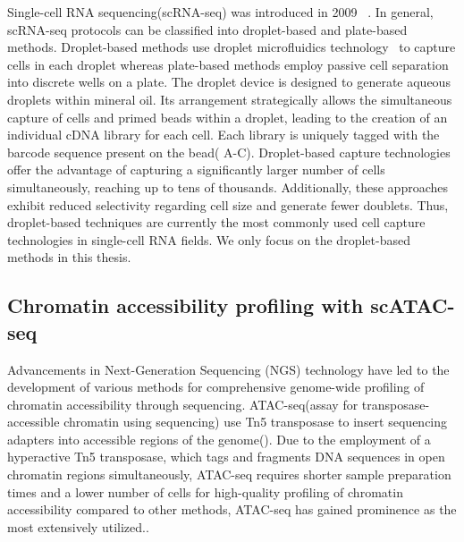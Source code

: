Single-cell RNA sequencing(scRNA-seq) was introduced in 2009 ~\citep{tang2009mrna}. In general, scRNA-seq protocols can be classified into droplet-based and plate-based methods. Droplet-based methods use droplet microfluidics technology~\citep{dropletcompare2019, droplet2019practice} to capture cells in each droplet whereas plate-based methods employ passive cell separation into discrete wells on a plate. The droplet device is designed to generate aqueous droplets within mineral oil. Its arrangement strategically allows the simultaneous capture of cells and primed beads within a droplet, leading to the creation of an individual cDNA library for each cell. Each library is uniquely tagged with the barcode sequence present on the bead( A-C). Droplet-based capture technologies offer the advantage of capturing a significantly larger number of cells simultaneously, reaching up to tens of thousands. Additionally, these approaches exhibit reduced selectivity regarding cell size and generate fewer doublets. Thus, droplet-based techniques are currently the most commonly used cell capture technologies in single-cell RNA fields. We only focus on the droplet-based methods in this thesis.


\subsection{Chromatin accessibility profiling with scATAC-seq}
\label{background:sec1:scATAC}

Advancements in Next-Generation Sequencing (NGS) technology have led to the development of various methods for comprehensive genome-wide profiling of chromatin accessibility through sequencing. ATAC-seq(assay for transposase-accessible chromatin using sequencing) \citep{buenrostro2013atacseq} use Tn5 transposase to insert sequencing adapters into accessible regions of the genome(). Due to the employment of a hyperactive Tn5 transposase, which tags and fragments DNA sequences in open chromatin regions simultaneously, ATAC-seq requires shorter sample preparation times and a lower number of cells for high-quality profiling of chromatin accessibility compared to other methods, ATAC-seq has gained prominence as the most extensively utilized.\citep{minnoye2021chromatin}.

